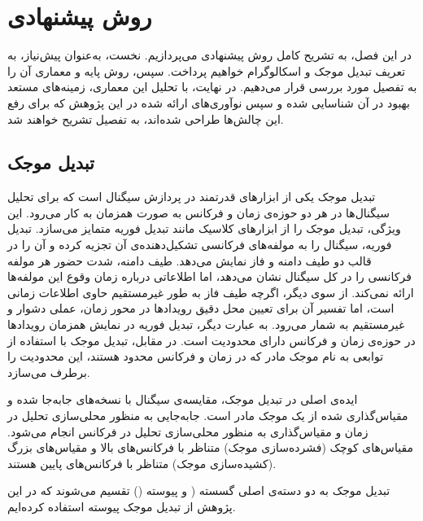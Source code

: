 \chapter{روش پیشنهادی}
\clearpage

در این فصل، به تشریح کامل روش پیشنهادی می‌پردازیم. نخست، به‌عنوان پیش‌نیاز، به تعریف تبدیل موجک و
اسکالوگرام
خواهیم پرداخت. سپس، روش پایه و معماری آن را به تفصیل مورد بررسی قرار می‌دهیم. در نهایت، با تحلیل این معماری، زمینه‌های مستعد بهبود در آن شناسایی شده و سپس نوآوری‌های ارائه شده در این پژوهش که برای رفع این چالش‌ها طراحی شده‌اند، به تفصیل تشریح خواهند شد.

\section{تبدیل موجک}

تبدیل موجک یکی از ابزارهای قدرتمند در پردازش سیگنال است که برای تحلیل سیگنال‌ها در هر دو حوزه‌ی زمان و فرکانس به صورت همزمان به کار می‌رود. این ویژگی، تبدیل موجک را از ابزارهای کلاسیک مانند
تبدیل فوریه
متمایز می‌سازد. تبدیل فوریه، سیگنال را به مولفه‌های فرکانسی تشکیل‌دهنده‌ی آن تجزیه کرده و آن را در قالب دو طیف دامنه و فاز نمایش می‌دهد. طیف دامنه، شدت حضور هر مولفه فرکانسی را در کل سیگنال نشان می‌دهد، اما اطلاعاتی درباره زمان وقوع این مولفه‌ها ارائه نمی‌کند. از سوی دیگر، اگرچه طیف فاز به طور غیرمستقیم حاوی اطلاعات زمانی است، اما تفسیر آن برای تعیین محل دقیق رویدادها در محور زمان، عملی دشوار و غیرمستقیم به شمار می‌رود. به عبارت دیگر، تبدیل فوریه در نمایش همزمان رویدادها در حوزه‌ی زمان و فرکانس دارای محدودیت است. در مقابل، تبدیل موجک با استفاده از توابعی به نام
موجک مادر
که در زمان و فرکانس محدود هستند، این محدودیت را برطرف می‌سازد.

ایده‌ی اصلی در تبدیل موجک، مقایسه‌ی سیگنال با نسخه‌های جابه‌جا شده و مقیاس‌گذاری شده از یک موجک مادر است. جابه‌جایی به منظور محلی‌سازی تحلیل در زمان و مقیاس‌گذاری به منظور محلی‌سازی تحلیل در فرکانس انجام می‌شود. مقیاس‌های کوچک (فشرده‌سازی موجک) متناظر با فرکانس‌های بالا و مقیاس‌های بزرگ (کشیده‌سازی موجک) متناظر با فرکانس‌های پایین هستند.

تبدیل موجک به دو دسته‌ی اصلی گسسته (
و پیوسته ()
تقسیم می‌شوند که در این پژوهش از تبدیل موجک پیوسته استفاده کرده‌ایم.

